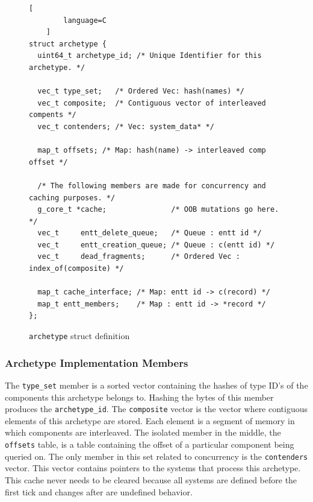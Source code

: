 \begin{figure}[H]
    \begin{lstlisting}[
        language=C
    ]
struct archetype {
  uint64_t archetype_id; /* Unique Identifier for this archetype. */
  
  vec_t type_set;   /* Ordered Vec: hash(names) */
  vec_t composite;  /* Contiguous vector of interleaved compents */
  vec_t contenders; /* Vec: system_data* */
  
  map_t offsets; /* Map: hash(name) -> interleaved comp offset */
  
  /* The following members are made for concurrency and caching purposes. */
  g_core_t *cache;               /* OOB mutations go here. */
  vec_t     entt_delete_queue;   /* Queue : entt id */
  vec_t     entt_creation_queue; /* Queue : c(entt id) */
  vec_t     dead_fragments;      /* Ordered Vec : index_of(composite) */
  
  map_t cache_interface; /* Map: entt id -> c(record) */
  map_t entt_members;    /* Map : entt id -> *record */
};
    \end{lstlisting}
    \caption{\texttt{archetype} struct definition}
    \label{code:archetype}
\end{figure}

\subsubsection{Archetype Implementation Members}
The \texttt{type\_set} member is a sorted vector containing the hashes of type ID's of the components this archetype belongs to. Hashing the bytes of this member produces the \texttt{archetype\_id}. The \texttt{composite} vector is the vector where contiguous elements of this archetype are stored. Each element is a segment of memory in which components are interleaved. The isolated member in the middle, the \texttt{offsets} table, is a table containing the offset of a particular component being queried on.  
The only member in this set related to concurrency is the \texttt{contenders} vector. This vector contains pointers to the systems that process this archetype. This cache never needs to be cleared because all systems are defined before the first tick and changes after are undefined behavior.


